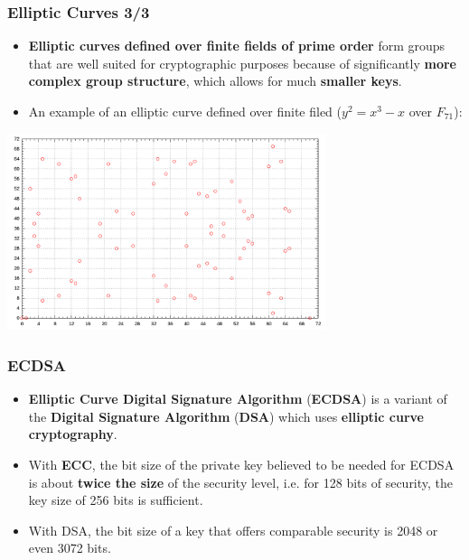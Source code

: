 \documentclass{beamer}
\begin{document}
\begin{frame}
  \frametitle{Elliptic Curves 3/3}
  \begin{itemize}
  \item \textbf{Elliptic curves defined over finite fields of prime order} form
    groups that are well suited for cryptographic purposes because of
    significantly \textbf{more complex group structure}, which allows for much
    \textbf{smaller keys}.
  \item An example of an elliptic curve defined over finite filed ($y^2 = x
    ^3 - x$ over $F_{71}$):
  \end{itemize}
  \begin{center}
    \includegraphics[width=0.7\textwidth]{ec_finite_field_group}
  \end{center}
\end{frame}

\begin{frame}
  \frametitle{ECDSA}
  \begin{itemize}  
  \item \textbf{Elliptic Curve Digital Signature Algorithm} (\textbf{ECDSA}) is
    a variant of the \textbf{Digital Signature Algorithm} (\textbf{DSA}) which
    uses \textbf{elliptic curve cryptography}.
  \item With \textbf{ECC}, the bit size of the private key believed to be needed
    for ECDSA is about \textbf{twice the size} of the security level, i.e. for
    128 bits of security, the key size of 256 bits is sufficient.
  \item With DSA, the bit size of a key that offers comparable security is 2048
    or even 3072 bits.
  \end{itemize}
\end{frame}
\end{document}
